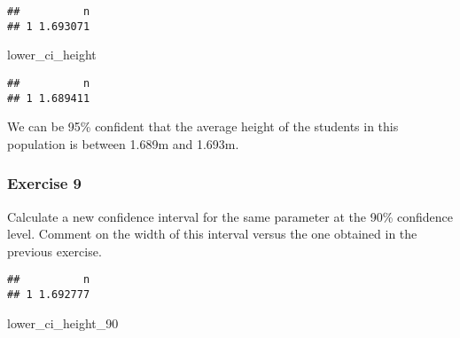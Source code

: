 \documentclass[
]{article}
\newenvironment{Shaded}{\begin{snugshade}}{\end{snugshade}}
\newcommand{\CommentTok}[1]{\textcolor[rgb]{0.56,0.35,0.01}{\textit{#1}}}
\newcommand{\DecValTok}[1]{\textcolor[rgb]{0.00,0.00,0.81}{#1}}
\newcommand{\FloatTok}[1]{\textcolor[rgb]{0.00,0.00,0.81}{#1}}
\newcommand{\KeywordTok}[1]{\textcolor[rgb]{0.13,0.29,0.53}{\textbf{#1}}}
\newcommand{\NormalTok}[1]{#1}
\newcommand{\OperatorTok}[1]{\textcolor[rgb]{0.81,0.36,0.00}{\textbf{#1}}}
\newcommand{\StringTok}[1]{\textcolor[rgb]{0.31,0.60,0.02}{#1}}
\begin{document}
\begin{verbatim}
##          n
## 1 1.693071
\end{verbatim}

\begin{Shaded}
\begin{Highlighting}[]
\NormalTok{lower_ci_height}
\end{Highlighting}
\end{Shaded}

\begin{verbatim}
##          n
## 1 1.689411
\end{verbatim}

We can be 95\% confident that the average height of the students in this
population is between 1.689m and 1.693m.

\hypertarget{exercise-9}{%
\subsubsection{Exercise 9}\label{exercise-9}}

Calculate a new confidence interval for the same parameter at the 90\%
confidence level. Comment on the width of this interval versus the one
obtained in the previous exercise.

\begin{Shaded}
\end{Shaded}

\begin{verbatim}
##          n
## 1 1.692777
\end{verbatim}

\begin{Shaded}
\begin{Highlighting}[]
\NormalTok{lower_ci_height_}\DecValTok{90}
\end{Highlighting}
\end{Shaded}
\end{document}
